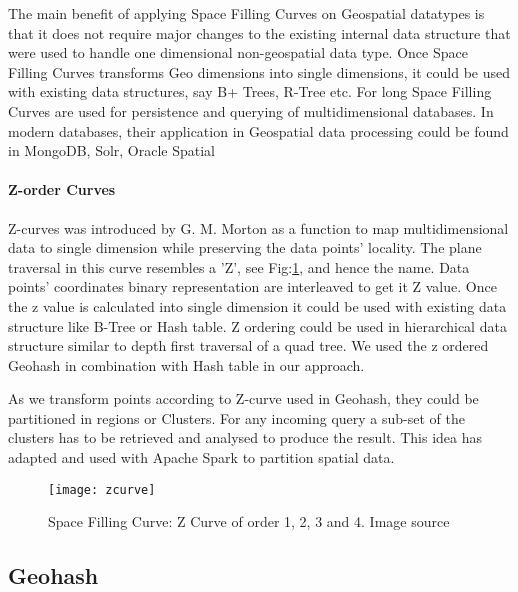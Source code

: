 \documentclass[article,type=msc,colorback,12pt,accentcolor=tud1d]{tudthesis}
\begin{document}
		  The main benefit of applying Space Filling Curves on Geospatial datatypes is that it does not require major changes to the existing internal data structure that were used to handle one dimensional non-geospatial data type. Once Space Filling Curves transforms Geo dimensions into single dimensions, it could be used with existing data structures, say B+ Trees, R-Tree etc\cite{Asano1995}. For long Space Filling Curves are used for persistence and querying of multidimensional databases\cite{Lawder:2000:USC:646102.681186}. In modern databases, their application in Geospatial data processing could be found in MongoDB\cite{MongoDB}, Solr\cite{apachesolr}, Oracle Spatial\cite{oraclespatial} 
		  
		  \clearpage
		  \paragraph{Z-order Curves}
		  Z-curves was introduced by G. M. Morton as a function to map multidimensional data to single dimension while preserving the data points' locality. The plane traversal in this curve resembles a 'Z', see Fig:\ref{fig:zcurve},  and hence the name. Data points' coordinates binary representation are interleaved to get it Z value. Once the z value is calculated into single dimension it could be used with existing data structure like B-Tree or Hash table. Z ordering could be used in hierarchical data structure similar to depth first traversal of a quad tree\cite{wiki:Zcurves_1, wiki:Zcurves}. We used the z ordered Geohash in combination with Hash table in our approach. 
		  
		  As we transform points according to Z-curve used in Geohash, they could be partitioned in regions or Clusters. For any incoming query a sub-set of the clusters has to be retrieved and analysed to produce the result. This idea has adapted and used with Apache Spark to partition spatial data.
		  
		  	\begin{figure}[h]
		  		\centering
		  		\texttt{[image: zcurve]}
		  		\caption{Space Filling Curve: Z Curve of order 1, 2, 3 and 4. Image source \cite{wiki:Zcurves_1, wiki:Zcurves} }
		  		\label{fig:zcurve}
		  	\end{figure}
		  
		  
		  \clearpage
		   \subsection{Geohash}
		   
\end{document}
